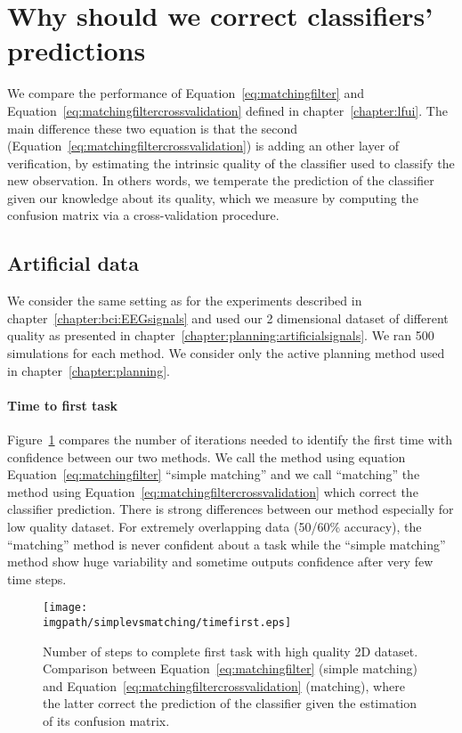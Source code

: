 
\section{Why should we correct classifiers' predictions}
\label{chapter:limitiations:simplevsmatching}

We compare the performance of Equation~\ref{eq:matchingfilter} and Equation~\ref{eq:matchingfiltercrossvalidation} defined in chapter~\ref{chapter:lfui}. The main difference these two equation is that the second (Equation~\ref{eq:matchingfiltercrossvalidation}) is adding an other layer of verification, by estimating the intrinsic quality of the classifier used to classify the new observation. In others words, we temperate the prediction of the classifier given our knowledge about its quality, which we measure by computing the confusion matrix via a cross-validation procedure.

\subsection{Artificial data}

We consider the same setting as for the experiments described in chapter~\ref{chapter:bci:EEGsignals} and used our 2 dimensional dataset of different quality as presented in chapter~\ref{chapter:planning:artificialsignals}. We ran 500 simulations for each method. We consider only the active planning method used in chapter~\ref{chapter:planning}.

\paragraph{Time to first task} Figure~\ref{fig:timefirst_simplevsmatching} compares the number of iterations needed to identify the first time with confidence between our two methods. We call the method using equation Equation~\ref{eq:matchingfilter} ``simple matching'' and we call ``matching'' the method using Equation~\ref{eq:matchingfiltercrossvalidation} which correct the classifier prediction. There is strong differences between our method especially for low quality dataset. For extremely overlapping data (50/60\% accuracy), the ``matching'' method is never confident about a task while the ``simple matching'' method show huge variability and sometime outputs confidence after very few time steps. 

\begin{figure}[!htbp]
\centering
\texttt{[image: \\imgpath/simplevsmatching/timefirst.eps]}
\caption{Number of steps to complete first task with high quality 2D dataset. Comparison between Equation~\ref{eq:matchingfilter} (simple matching) and Equation~\ref{eq:matchingfiltercrossvalidation} (matching), where the latter correct the prediction of the classifier given the estimation of its confusion matrix.}
\label{fig:timefirst_simplevsmatching}
\end{figure} 

